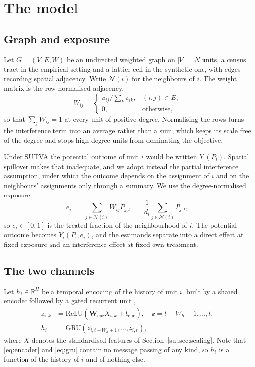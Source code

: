 \documentclass[journal]{IEEEtran}
\begin{document}
\section{The model}
\label{sec:model}

\subsection{Graph and exposure}

Let $G = (V, E, W)$ be an undirected weighted graph on $|V| = N$ units, a census
tract in the empirical setting and a lattice cell in the synthetic one, with
edges recording spatial adjacency. Write $\mathcal{N}(i)$ for the neighbours of
$i$. The weight matrix is the row-normalised adjacency,
\begin{equation}
  W_{ij} =
  \begin{cases}
    a_{ij} \big/ \sum_{k} a_{ik}, & (i,j) \in E,\\[2pt]
    0, & \text{otherwise,}
  \end{cases}
  \label{eq:weights}
\end{equation}
so that $\sum_{j} W_{ij} = 1$ at every unit of positive degree. Normalising the
rows turns the interference term into an average rather than a sum, which keeps
its scale free of the degree and stops high degree units from dominating the
objective.

Under SUTVA the potential outcome of unit $i$ would be written $Y_i(P_i)$.
Spatial spillover makes that inadequate, and we adopt instead the partial
interference assumption, under which the outcome depends on the assignment of
$i$ and on the neighbours' assignments only through a summary. We use the
degree-normalised exposure
\begin{equation}
  e_i \;=\; \sum_{j \in \mathcal{N}(i)} W_{ij} P_{j,t}
        \;=\; \frac{1}{d_i} \sum_{j \in \mathcal{N}(i)} P_{j,t},
  \label{eq:exposure}
\end{equation}
so $e_i \in [0,1]$ is the treated fraction of the neighbourhood of $i$. The
potential outcome becomes $Y_i(P_i, e_i)$, and the estimands separate into a
direct effect at fixed exposure and an interference effect at fixed own
treatment.

\subsection{The two channels}

Let $h_i \in \mathbb{R}^{H}$ be a temporal encoding of the history of unit $i$,
built by a shared encoder followed by a gated recurrent unit \cite{cho2014gru},
\begin{align}
  z_{i,k} &= \mathrm{ReLU}\!\left( \mathbf{W}_{\mathrm{enc}} \tilde{X}_{i,k}
             + b_{\mathrm{enc}} \right), \quad k = t-W_h+1, \dots, t,
             \label{eq:encoder}\\
  h_i     &= \mathrm{GRU}\!\left( z_{i,t-W_h+1}, \dots, z_{i,t} \right),
             \label{eq:gru}
\end{align}
where $\tilde{X}$ denotes the standardised features of
Section~\ref{subsec:scaling}. Note that \eqref{eq:encoder} and \eqref{eq:gru}
contain no message passing of any kind, so $h_i$ is a function of the history of
$i$ and of nothing else.
\end{document}
